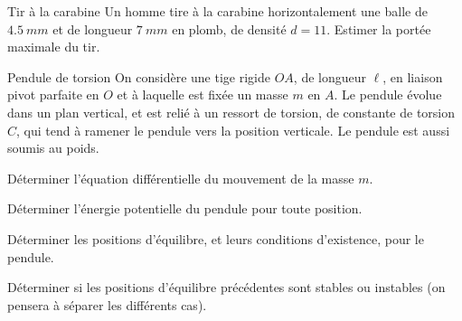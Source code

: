 \begin{exo}[PC][1][colle]{Tir à la carabine}
  Un homme tire à la carabine horizontalement une balle de $\SI{4,5}{mm}$ et de longueur $\SI{7}{mm}$ en plomb, de densité $d=\num{11}$.
  Estimer la portée maximale du tir.
\end{exo}

\begin{exo}[PC][3][oral]{Pendule de torsion}
  On considère une tige rigide $OA$, de longueur $\ell$, en liaison pivot parfaite en $O$ et à laquelle est fixée un masse $m$ en $A$. Le pendule évolue dans un plan vertical, et est relié à un ressort de torsion, de constante de torsion $C$, qui tend à ramener le pendule vers la position verticale. Le pendule est aussi soumis au poids.
  \begin{quest}
  \item Déterminer l'équation différentielle du mouvement de la masse $m$.
  \item Déterminer l'énergie potentielle du pendule pour toute position.
  \item Déterminer les positions d'équilibre, et leurs conditions d'existence, pour le pendule.
  \item Déterminer si les positions d'équilibre précédentes sont stables ou instables (on pensera à séparer les différents cas).
\end{quest}
\end{exo}
